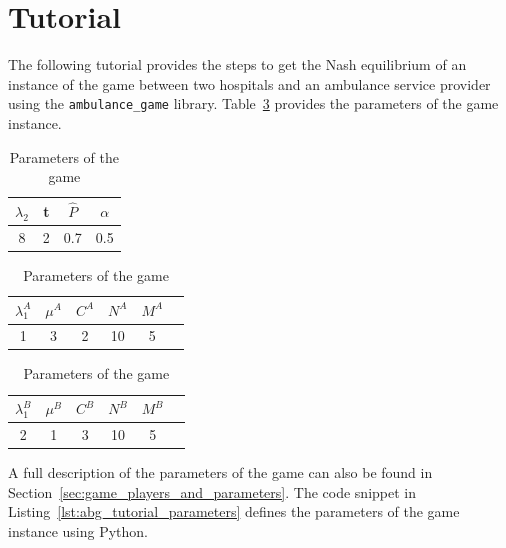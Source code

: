 \section{Tutorial}\label{sec:ambulance_game_tutorial}

The following tutorial provides the steps to get the Nash
equilibrium of an instance of the game between two hospitals and an ambulance
service provider using the \texttt{ambulance\_game} library.
Table~\ref{tab:ambulance_game_example} provides the parameters of the game
instance.

\begin{table}[H]
    \begin{center}
        \begin{tabular}{||c|c|c|c||}
            \hline
            \(\lambda_2\) & t & \footnotesize{\(\hat{P}\)} & \(\alpha\) \\
            \hline\hline
            8 & 2 & 0.7 & 0.5 \\
            \hline
        \end{tabular}

        \vspace{0.3cm}

        \begin{tabular}{||c|c|c|c|c|c||}
            \hline
            \(\lambda_1^A\) & \(\mu^A\) & \(C^A\) & \(N^A\) & \(M^A\) \\
            \hline\hline
            1 & 3 & 2 & 10 & 5 \\
            \hline
        \end{tabular}

        \vspace{0.3cm}
        
        \begin{tabular}{||c|c|c|c|c|c||}
            \hline
            \(\lambda_1^B\) & \(\mu^B\) & \(C^B\) & \(N^B\) & \(M^B\) \\
            \hline\hline
            2 & 1 & 3 & 10 & 5 \\
            \hline
        \end{tabular}
    \end{center}
    \caption{Parameters of the game}
    \label{tab:ambulance_game_example}
\end{table}

A full description of the parameters of the game can also be found in
Section~\ref{sec:game_players_and_parameters}.
The code snippet in Listing~\ref{lst:abg_tutorial_parameters} defines the
parameters of the game instance using Python.

